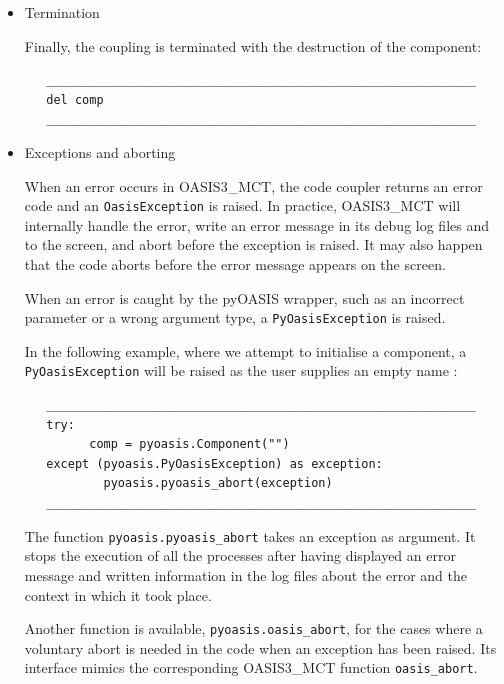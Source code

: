 \begin{itemize}
\begin{verbatim}
   ____________________________________________________________
   variable.get(date, field)
   ____________________________________________________________
\end{verbatim}

\item{Termination}
\label{{index:termination}}

Finally, the coupling is terminated with the destruction of
the component:

\begin{verbatim}
   ____________________________________________________________
   del comp
   ____________________________________________________________
\end{verbatim}


\item{Exceptions and aborting}
\label{{index:exceptions-and-aborting}}

When an error occurs in OASIS3\_MCT, the code coupler returns an error
code and an {\tt OasisException} is raised. In practice, OASIS3\_MCT will
internally handle the error, write an error message in its
debug log files and to the screen, and abort before the exception is raised. It
may also happen that the code aborts before the error message appears
on the screen.

When an error is caught by the pyOASIS wrapper, such as an incorrect parameter
or a wrong argument type, a {\tt PyOasisException} is raised.

In the following example, where we attempt to initialise a component,
a {\tt PyOasisException} will be raised as the user supplies an empty
name :

\begin{verbatim}
   ____________________________________________________________
   try:
         comp = pyoasis.Component("")
   except (pyoasis.PyOasisException) as exception:
           pyoasis.pyoasis_abort(exception)
   ____________________________________________________________
\end{verbatim}

The function {\tt pyoasis.pyoasis\_abort} takes an exception as argument.
It stops the execution  of all the processes after having displayed an error message and
written information in the log files about the error and the context in
which it took place.

Another function is available, {\tt pyoasis.oasis\_abort},
for the cases where a voluntary abort is needed in the code when
an exception has been raised. Its interface mimics the
corresponding OASIS3\_MCT function {\tt oasis\_abort}.

\end{itemize}

